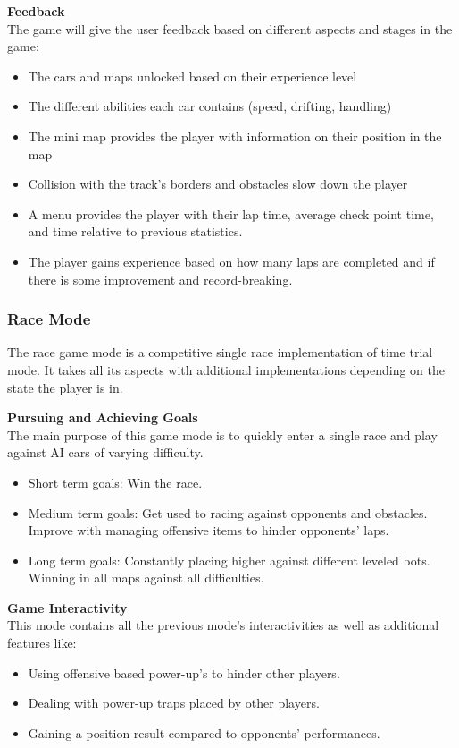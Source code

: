 \documentclass[12pt]{article}
\begin{document}
\noindent\textbf{Feedback}\\
The game will give the user feedback based on different aspects and stages in the game:
\begin{itemize}
\item The cars and maps unlocked based on their experience level
\item The different abilities each car contains (speed, drifting, handling)
\item The mini map provides the player with information on their position in the map
\item Collision with the track’s borders and obstacles slow down the player
\item A menu provides the player with their lap time, average check point time, and time relative to previous statistics.
\item The player gains experience based on how many laps are completed and if there is some improvement and record-breaking.
\end{itemize}

\subsubsection{Race Mode}

The race game mode is a competitive single race implementation of time trial mode. It takes all its aspects with additional implementations depending on the state the player is in.

\noindent\textbf{Pursuing and Achieving Goals}\\
The main purpose of this game mode is to quickly enter a single race and play against AI cars of varying difficulty.
\begin{itemize}
\item Short term goals: Win the race.
\item Medium term goals: Get used to racing against opponents and obstacles. Improve with managing offensive items to hinder opponents’ laps.
\item Long term goals: Constantly placing higher against different leveled bots. Winning in all maps against all difficulties.
\end{itemize}

\noindent\textbf{Game Interactivity}\\
This mode contains all the previous mode’s interactivities as well as additional features like:
\begin{itemize}
\item Using offensive based power-up’s to hinder other players.
\item Dealing with power-up traps placed by other players.
\item Gaining a position result compared to opponents’ performances.
\end{itemize}
\end{document}
